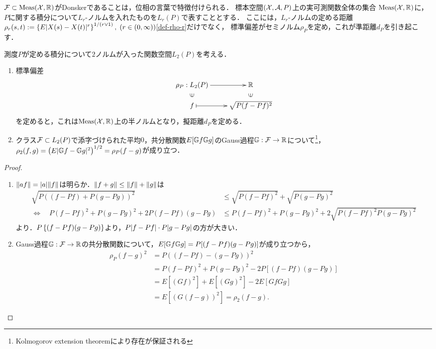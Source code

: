 \documentclass[uplatex,dvipdfmx]{jsreport}
\begin{document}
\begin{tcolorbox}[colframe=ForestGreen, colback=ForestGreen!10!white,breakable,colbacktitle=ForestGreen!40!white,coltitle=black,fonttitle=\bfseries\sffamily,
title=]
    $\mathcal{F}\subset\mathrm{Meas}(\mathcal{X},\mathbb{R})$がDonskerであることは，位相の言葉で特徴付けられる．
    標本空間$(\mathcal{X},\mathcal{A},P)$上の実可測関数全体の集合
    $\mathrm{Meas}(\mathcal{X},\mathbb{R})$に，$P$に関する積分について$L_r$-ノルムを入れたものを$L_r(P)$で表すこととする．
    ここには，$L_r$-ノルムの定める距離$\rho_r(s,t):=\left\{E\lvert X(s)-X(t)\rvert^r\right\}^{1/(r\lor 1)},\;(r\in(0,\infty))$\ref{def-rho-r}だけでなく，
    標準偏差がセミノルム$\rho_P$を定め，これが準距離$d_P$を引き起こす．
\end{tcolorbox}

\begin{proposition}[標準偏差の定めるセミノルム]
    測度$P$が定める積分について$2$ノルムが入った関数空間$L_2(P)$を考える．
    \begin{enumerate}
        \item 標準偏差
        \[\xymatrix@R-2pc{
            \rho_P:L_2(P)\ar[r]&\R\\
            \rotatebox[origin=c]{90}{$\in$}&\rotatebox[origin=c]{90}{$\in$}\\
            f\ar@{|->}[r]&\sqrt{P(f-Pf)^2}
        }\]
        を定めると，これは$\mathrm{Meas}(\mathcal{X},\mathbb{R})$上の半ノルムとなり，擬距離$d_P$を定める．
        \item クラス$\mathcal{F}\subset L_2(P)$で添字づけられた平均$0$，共分散関数$E[\mathbb{G} f\mathbb{G} g]$のGauss過程$\mathbb{G}:\mathcal{F}\to\mathbb{R}$について\footnote{Kolmogorov extension theoremにより存在が保証される}，$\rho_2(f,g)=\left(E\lvert\mathbb{G} f-\mathbb{G} g\rvert^2\right)^{1/2}=\rho_P(f-g)$が成り立つ．
    \end{enumerate}
\end{proposition}
\begin{proof}\mbox{}
    \begin{enumerate}
        \item $\|af\|=\lvert a\rvert\|f\|$は明らか．$\|f+g\|\le\|f\|+\|g\|$は
        \begin{align*}
            \sqrt{P((f-Pf)+P(g-Pg))^2}&\le\sqrt{P(f-Pf)^2}+\sqrt{P(g-Pg)^2}\\
            \Leftrightarrow\quad P(f-Pf)^2+P(g-Pg)^2+2P(f-Pf)(g-Pg)&\le P(f-Pf)^2+P(g-Pg)^2+2\sqrt{P(f-Pf)^2P(g-Pg)^2}
        \end{align*}
        より．$P\left\{(f-Pf)(g-Pg)\right\}$より，$P\lvert f-Pf\rvert\cdot P\lvert g-Pg\rvert$の方が大きい．
        \item 
        Gauss過程$\mathbb{G}:\mathcal{F}\to\mathbb{R}$の共分散関数について，$E[\mathbb{G} f\mathbb{G} g]=P[(f-Pf)(g-Pg)]$が成り立つから，
        \begin{align*}
            \rho_P(f-g)^2&=P((f-Pf)-(g-Pg))^2\\
            &=P(f-Pf)^2+P(g-Pg)^2-2P[(f-Pf)(g-Pg)]\\
            &=E[(Gf)^2]+E[(Gg)^2]-2E[GfGg]\\
            &=E[(G(f-g))^2]=\rho_2(f-g).
        \end{align*}
    \end{enumerate}
\end{proof}
\end{document}
